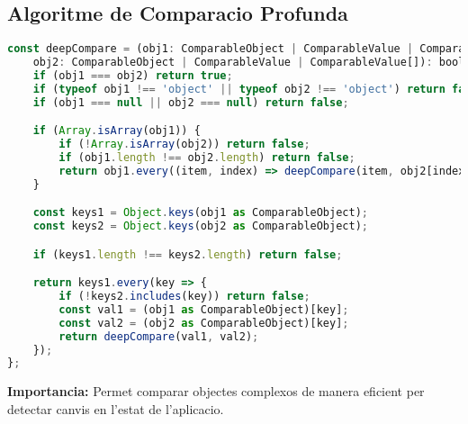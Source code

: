 \subsection{Algoritme de Comparacio Profunda}
\begin{lstlisting}[language=JavaScript]
const deepCompare = (obj1: ComparableObject | ComparableValue | ComparableValue[], 
    obj2: ComparableObject | ComparableValue | ComparableValue[]): boolean => {
    if (obj1 === obj2) return true;
    if (typeof obj1 !== 'object' || typeof obj2 !== 'object') return false;
    if (obj1 === null || obj2 === null) return false;

    if (Array.isArray(obj1)) {
        if (!Array.isArray(obj2)) return false;
        if (obj1.length !== obj2.length) return false;
        return obj1.every((item, index) => deepCompare(item, obj2[index]));
    }

    const keys1 = Object.keys(obj1 as ComparableObject);
    const keys2 = Object.keys(obj2 as ComparableObject);

    if (keys1.length !== keys2.length) return false;

    return keys1.every(key => {
        if (!keys2.includes(key)) return false;
        const val1 = (obj1 as ComparableObject)[key];
        const val2 = (obj2 as ComparableObject)[key];
        return deepCompare(val1, val2);
    });
};
\end{lstlisting}
\textbf{Importancia:} Permet comparar objectes complexos de manera eficient per detectar canvis en l'estat de l'aplicacio. 